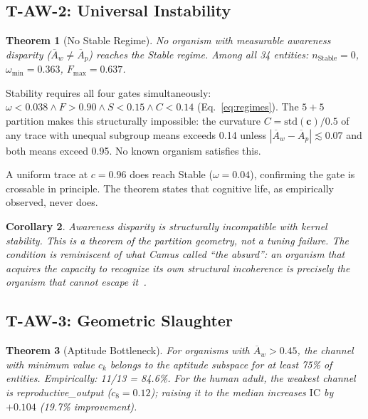 \documentclass[
  aps,
  prd,
  twocolumn,
  superscriptaddress,
  nofootinbib,
  floatfix
]{revtex4-2}
\newtheorem{theorem}{Theorem}
\newtheorem{corollary}[theorem]{Corollary}
\newcommand{\tvec}{\mathbf{c}}
\newcommand{\IC}{\mathrm{IC}}
\newcommand{\Aw}{\overline{A}_{\!w}}
\newcommand{\Ap}{\overline{A}_{\!p}}
\begin{document}
\subsection{T-AW-2: Universal Instability}

\begin{theorem}[No Stable Regime]\label{thm:TAW2}
No organism with measurable awareness disparity
($\Aw \neq \Ap$) reaches the Stable regime.  Among all 34
entities: $n_{\mathrm{Stable}} = 0$, $\omega_{\min} = 0.363$,
$F_{\max} = 0.637$.
\end{theorem}

Stability requires all four gates simultaneously:
$\omega < 0.038 \wedge F > 0.90 \wedge S < 0.15 \wedge
C < 0.14$ (Eq.~\ref{eq:regimes}).  The $5\!+\!5$ partition
makes this structurally impossible: the curvature $C =
\mathrm{std}(\tvec)/0.5$ of any trace with unequal subgroup
means exceeds 0.14 unless $|\Aw - \Ap| \lesssim 0.07$ and
both means exceed 0.95.  No known organism satisfies this.

A uniform trace at $c = 0.96$ does reach Stable
($\omega = 0.04$), confirming the gate is crossable in
principle.  The theorem states that cognitive life, as
empirically observed, never does.

\begin{corollary}
Awareness disparity is structurally incompatible with kernel
stability.  This is a theorem of the partition geometry,
not a tuning failure.  The condition is reminiscent of what
Camus called ``the absurd'': an organism that acquires the
capacity to recognize its own structural incoherence is
precisely the organism that cannot escape
it~\cite{camus1942sisyphus}.
\end{corollary}

\subsection{T-AW-3: Geometric Slaughter}

\begin{theorem}[Aptitude Bottleneck]\label{thm:TAW3}
For organisms with $\Aw > 0.45$, the channel with minimum
value $c_k$ belongs to the aptitude subspace for at least
75\% of entities.  Empirically: 11/13 = 84.6\%.  For the
human adult, the weakest channel is \textup{reproductive\_output}
($c_8 = 0.12$); raising it to the median
increases $\IC$ by $+0.104$ (19.7\% improvement).
\end{theorem}
\end{document}
